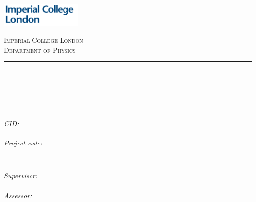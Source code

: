 \begin{titlepage}

\newcommand{\HRule}{\rule{\linewidth}{0.5mm}} %



\includegraphics[width = 4cm]{./imperial}\\[0.5cm] 

\center %


\textsc{\Large Imperial College London}\\[0.5cm] 
\textsc{\large Department of Physics}\\[0.5cm] 


\HRule \\[0.4cm]
{ \huge \bfseries \reporttitle}\\ %
\HRule \\[1.5cm]
 

\begin{minipage}{0.4\textwidth}
\begin{flushleft} \large
\emph{CID:}\\
\CID\\
\vspace*{1em}
\emph{Project code:}\\
\projectcode
\end{flushleft}
\end{minipage}
~
\begin{minipage}{0.4\textwidth}
\begin{flushright} \large
\emph{Supervisor:} \\
\supervisor\\ %
\vspace*{1em}
\emph{Assessor:}\\
\assessor
\end{flushright}
\end{minipage}\\[4cm]


\end{titlepage}
